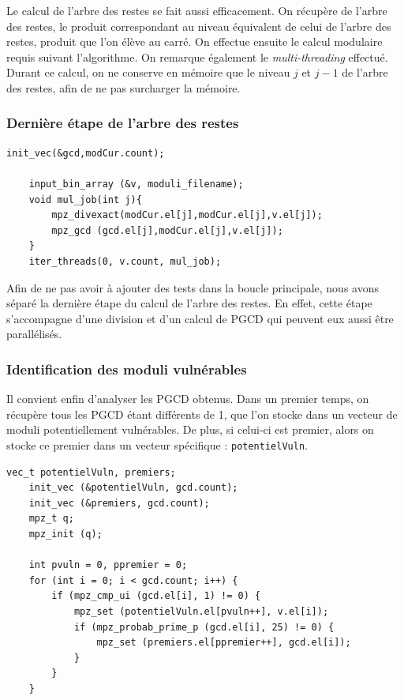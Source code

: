 Le calcul de l'arbre des restes se fait aussi efficacement. On récupère de l'arbre des restes, le produit correspondant au niveau équivalent de celui de l'arbre des restes, produit que l'on élève au carré. On effectue ensuite le calcul modulaire requis suivant l'algorithme. On remarque également le \textit{multi-threading} effectué. Durant ce calcul, on ne conserve en mémoire que le niveau $j$ et $j-1$ de l'arbre des restes, afin de ne pas surcharger la mémoire. \\



\subsubsection{Dernière étape de l'arbre des restes}

\begin{lstlisting}[style=customc,caption=fact\_superspeed.c - partie 4, label=fact4]
init_vec(&gcd,modCur.count);
	
	input_bin_array (&v, moduli_filename);
	void mul_job(int j){
		mpz_divexact(modCur.el[j],modCur.el[j],v.el[j]); 
		mpz_gcd (gcd.el[j],modCur.el[j],v.el[j]); 
	}
	iter_threads(0, v.count, mul_job);
\end{lstlisting}

Afin de ne pas avoir à ajouter des tests dans la boucle principale, nous avons séparé la dernière étape du calcul de l'arbre des restes. En effet, cette étape s'accompagne d'une division et d'un calcul de PGCD qui peuvent eux aussi être parallélisés. \\





\subsubsection{Identification des moduli vulnérables}
Il convient enfin d'analyser les PGCD obtenus. Dans un premier temps, on récupère tous les PGCD étant différents de 1, que l'on stocke dans un vecteur de moduli potentiellement vulnérables. De plus, si celui-ci est premier, alors on stocke ce premier dans un vecteur spécifique : \verb+potentielVuln+. 

\begin{lstlisting}[style=customc,caption=fact\_superspeed.c - partie 5a, label=fact5]
	vec_t potentielVuln, premiers;
	init_vec (&potentielVuln, gcd.count);
	init_vec (&premiers, gcd.count);
	mpz_t q;
	mpz_init (q);
	
	int pvuln = 0, ppremier = 0;
	for (int i = 0; i < gcd.count; i++) {
		if (mpz_cmp_ui (gcd.el[i], 1) != 0) {
			mpz_set (potentielVuln.el[pvuln++], v.el[i]);
			if (mpz_probab_prime_p (gcd.el[i], 25) != 0) {
				mpz_set (premiers.el[ppremier++], gcd.el[i]);
			}
		}
	}
\end{lstlisting}


